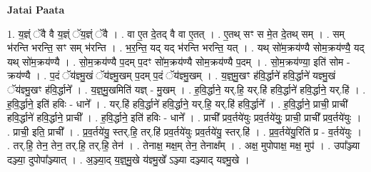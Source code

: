 \documentclass[17pt]{extarticle}
\begin{document}
\textbf{Jatai Paata} \newline

1. य॒ज्ञ्ं ॅवै वै य॒ज्ञ्ं ॅय॒ज्ञ्ं ॅवै । . वा ए॒त दे॒तद् वै वा ए॒तत् । . ए॒तथ् सꣳ स मे॒त दे॒तथ् सम् । . सम् भ॑रन्ति भरन्ति॒ सꣳ सम् भ॑रन्ति । . भ॒र॒न्ति॒ यद् यद् भ॑रन्ति भरन्ति॒ यत् । . यथ् सो॑म॒क्रय॑ण्यै सोम॒क्रय॑ण्यै॒ यद् यथ् सो॑म॒क्रय॑ण्यै । . सो॒म॒क्रय॑ण्यै प॒दम् प॒दꣳ सो॑म॒क्रय॑ण्यै सोम॒क्रय॑ण्यै प॒दम् । . सो॒म॒क्रय॑ण्या॒ इति॑ सोम - क्रय॑ण्यै । . प॒दं ॅय॑ज्ञ्मु॒खं ॅय॑ज्ञ्मु॒खम् प॒दम् प॒दं ॅय॑ज्ञ्मु॒खम् । . य॒ज्ञ्॒मु॒खꣳ ह॑वि॒र्द्धाने॑ हवि॒र्द्धाने॑ यज्ञ्मु॒खं ॅय॑ज्ञ्मु॒खꣳ ह॑वि॒र्द्धाने᳚ । . य॒ज्ञ्॒मु॒खमिति॑ यज्ञ् - मु॒खम् । . ह॒वि॒र्द्धाने॒ यर्.हि॒ यर्.हि॑ हवि॒र्द्धाने॑ हवि॒र्द्धाने॒ यर्.हि॑ । . ह॒वि॒र्द्धाने॒ इति॑ हविः - धाने᳚ । . यर्.हि॑ हवि॒र्द्धाने॑ हवि॒र्द्धाने॒ यर्.हि॒ यर्.हि॑ हवि॒र्द्धाने᳚ । . ह॒वि॒र्द्धाने॒ प्राची॒ प्राची॑ हवि॒र्द्धाने॑ हवि॒र्द्धाने॒ प्राची᳚ । . ह॒वि॒र्द्धाने॒ इति॑ हविः - धाने᳚ । . प्राची᳚ प्रव॒र्तये॑युः प्रव॒र्तये॑युः॒ प्राची॒ प्राची᳚ प्रव॒र्तये॑युः । . प्राची॒ इति॒ प्राची᳚ । . प्र॒व॒र्तये॑यु॒ स्तर्.हि॒ तर्.हि॑ प्रव॒र्तये॑युः प्रव॒र्तये॑यु॒ स्तर्.हि॑ । . प्र॒व॒र्तये॑यु॒रिति॑ प्र - व॒र्तये॑युः । . तर्.हि॒ तेन॒ तेन॒ तर्.हि॒ तर्.हि॒ तेन॑ । . तेनाक्ष॒ मक्ष॒म् तेन॒ तेनाक्ष᳚म् । . अक्ष॒ मुपोपाक्ष॒ मक्ष॒ मुप॑ । . उपा᳚ञ्ज्या दञ्ज्या॒ दुपोपा᳚ञ्ज्यात् । . अ॒ञ्ज्या॒द् य॒ज्ञ्॒मु॒खे य॑ज्ञ्मु॒खे᳚ ऽञ्ज्या दञ्ज्याद् यज्ञ्मु॒खे । \newline
\end{document}
